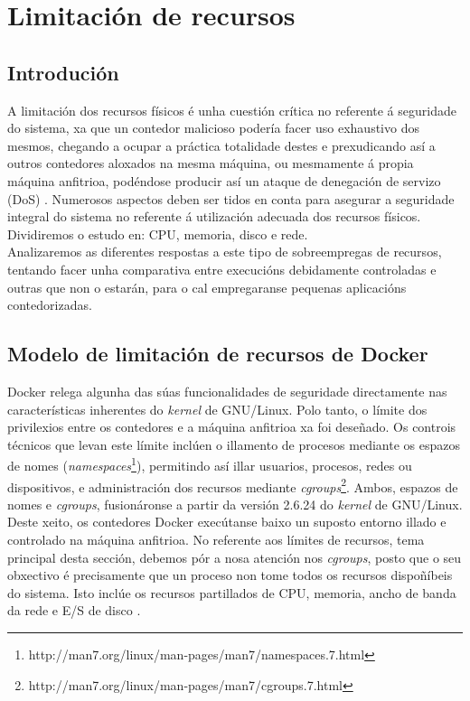 \chapter{Limitación de recursos}
\minitoc
\clearpage

\section{Introdución}

A limitación dos recursos físicos é unha cuestión crítica no referente á seguridade do sistema, xa que un contedor malicioso podería facer uso exhaustivo dos mesmos, chegando a ocupar a práctica totalidade destes e prexudicando así a outros contedores aloxados na mesma máquina, ou mesmamente á propia máquina anfitrioa, podéndose producir así un ataque de denegación de servizo (\gls{DoS}) \cite{OS-level-security}. Numerosos aspectos deben ser tidos en conta para asegurar a seguridade integral do sistema no referente á utilización adecuada dos recursos físicos. Dividiremos o estudo en: CPU, memoria, disco e rede.\\

Analizaremos as diferentes respostas a este tipo de sobreempregas de recursos, tentando facer unha comparativa entre execucións debidamente controladas e outras que non o estarán, para o cal empregaranse pequenas aplicacións contedorizadas.

\section{Modelo de limitación de recursos de Docker}

Docker relega algunha das súas funcionalidades de seguridade directamente nas características inherentes do \textit{kernel} de GNU/Linux. Polo tanto, o límite dos privilexios entre os contedores e a máquina anfitrioa xa foi deseñado. Os controis técnicos que levan este límite inclúen o illamento de procesos mediante os espazos de nomes (\textit{namespaces}\footnote{http://man7.org/linux/man-pages/man7/namespaces.7.html}), permitindo así illar usuarios, procesos, redes ou dispositivos, e administración dos recursos mediante \textit{cgroups}\footnote{http://man7.org/linux/man-pages/man7/cgroups.7.html}. Ambos, espazos de nomes e \textit{cgroups}, fusionáronse a partir da versión 2.6.24 do \textit{kernel} de GNU/Linux. Deste xeito, os contedores Docker execútanse baixo un suposto entorno illado e controlado na máquina anfitrioa. No referente aos límites de recursos, tema principal desta sección, debemos pór a nosa atención nos \textit{cgroups}, posto que o seu obxectivo é precisamente que un proceso non tome todos os recursos dispoñíbeis do sistema. Isto inclúe os recursos partillados de CPU, memoria, ancho de banda da rede e E/S de disco \cite{To-Docker-Or-Not-To-Docker}. \\

